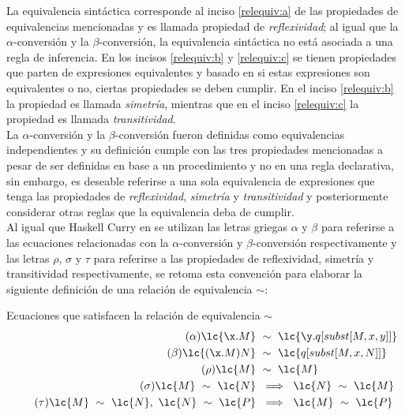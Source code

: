 La equivalencia sintáctica corresponde al inciso \ref{relequiv:a} de las
propiedades de equivalencias mencionadas y es llamada propiedad de
\emph{reflexividad}; al igual que la \(\alpha\)-conversión y la
\(\beta\)-conversión, la equivalencia sintáctica no está asociada a una regla de
inferencia. En los incisos \ref{relequiv:b} y \ref{relequiv:c} se tienen
propiedades que parten de expresiones equivalentes y basado en si estas
expresiones son equivalentes o no, ciertas propiedades se deben cumplir. En el
inciso \ref{relequiv:b} la propiedad es llamada \emph{simetría}, mientras que en el
inciso \ref{relequiv:c} la propiedad es llamada \emph{transitividad}. \\

La \(\alpha\)-conversión y la \(\beta\)-conversión fueron definidas como
equivalencias independientes y su definición cumple con las tres propiedades
mencionadas a pesar de ser definidas en base a un procedimiento y no en una
regla declarativa, sin embargo, es deseable referirse a una sola equivalencia de
expresiones que tenga las propiedades de \emph{reflexividad}, \emph{simetría} y
\emph{transitividad} y posteriormente considerar otras reglas que la equivalencia
deba de cumplir. \\

Al igual que Haskell Curry en \cite[p.~59]{Curry:CombinatoryLogicI} se utilizan
las letras griegas \(\alpha\) y \(\beta\) para referirse a las ecuaciones
relacionadas con la \(\alpha\)-conversión y \(\beta\)-conversión respectivamente
y las letras \(\rho\), \(\sigma\) y \(\tau\) para referirse a las propiedades de
reflexividad, simetría y transitividad respectivamente, se retoma esta
convención para elaborar la siguiente definición de una relación de equivalencia
\(\sim\): \\

\begin{defi} Ecuaciones que satisfacen la relación de equivalencia \(\sim\)
  \label{definicion:1}
  \begin{subequations}
    \begin{align}
      \label{definicion:1:alpha} \tag{\ensuremath{\alpha}}
      \lc{\x.M}\ &\sim\ \lc{\y.q[subst[M,x,y]]}
      \\
      \label{definicion:1:beta} \tag{\ensuremath{\beta}}
      \lc{(\x.M)N}\ &\sim\ \lc{q[subst[M,x,N]]}
      \\
      \label{definicion:1:rho} \tag{\ensuremath{\rho}}
      \lc{M}\ &\sim\ \lc{M}
      \\
      \label{definicion:1:sigma} \tag{\ensuremath{\sigma}}
      \lc{M}\ \sim\ \lc{N}\ &\implies\ \lc{N}\ \sim\ \lc{M}
      \\
      \label{definicion:1:tau} \tag{\ensuremath{\tau}}
      \lc{M}\ \sim\ \lc{N},\ \lc{N}\ \sim\ \lc{P}\ &\implies\ \lc{M}\ \sim\ \lc{P}
    \end{align}
  \end{subequations}
\end{defi} \

